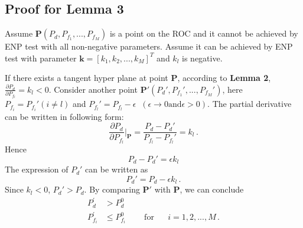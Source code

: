 \documentclass[12pt,journal,a4paper,twoside,onecolumn,draft]{IEEEtran}
\begin{document}
\begin{spacing}{2.5}
\subsection{Proof for Lemma 3}
Assume $\mathbf{P} (P_d, P_{f_1}, ..., P_{f_M})$ is a point on the ROC and it cannot be achieved by ENP test with all non-negative parameters. Assume it can be achieved by ENP test with parameter $\mathbf{k} = [k_1, k_2, ..., k_M]^T$ and $k_l$ is negative.

 If there exists a tangent hyper plane at point $\mathbf{P}$, according to \textbf{Lemma 2}, $\frac{\partial P_d}{\partial P_{f_l}} = k_l < 0$. Consider another point $\mathbf{P}' (P_d', P_{f_1}', ..., P_{f_M}')$, here $P_{f_i} = P_{f_i}' (i \neq l)$ and $P_{f_l}' = P_{f_l} - \epsilon \;\;(\epsilon \rightarrow 0 \text{and} \epsilon >0)$. The partial derivative can be written in following form:
 \begin{equation}
   \frac{\partial P_d}{ \partial P_{f_l}} \bigg|_{\mathbf{P}} = \frac{P_d - P_d'}{P_{f_l} - P_{f_l}'} = k_l\,.
 \end{equation}
 Hence
 \begin{equation}
   P_d - P_d' = \epsilon k_l
 \end{equation}
 The expression of $P_d'$ can be written as
 \begin{equation}
   P_d'= P_d - \epsilon k_l\,.
 \end{equation}
Since $k_l < 0$, $P_d' > P_d$. By comparing $\mathbf{P}'$ with $\mathbf{P}$, we can conclude
\begin{equation}
\begin{split}
  P_{d}^\prime &> P_{d}^0\\
  P_{f_i}^\prime &\leq P_{f_i}^0 \;\;\;\;\;\;\;\;\text{for}\;\;\;\;\;\; i=1, 2, ..., M\,.
\end{split}
\end{equation}


\end{spacing}
\end{document}
